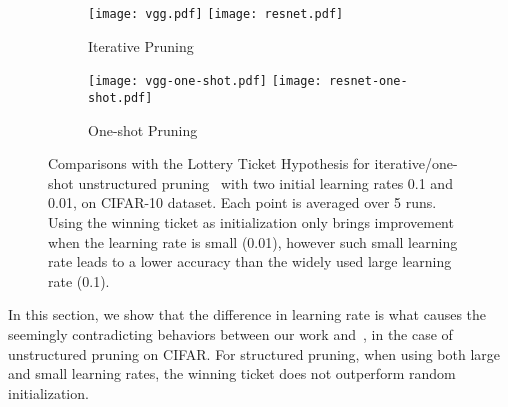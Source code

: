 \begin{figure*}[!ht]
\centering
\begin{minipage}{0.96\textwidth}
 \begin{subfigure}{\textwidth}
 \centering
 \texttt{[image: vgg.pdf]}
 \texttt{[image: resnet.pdf]}
 \caption{Iterative Pruning}
 \label{iterative-1}
 \end{subfigure}
\end{minipage}
 \begin{minipage}{0.96\textwidth}
 \begin{subfigure}{\textwidth}
 \centering
 \texttt{[image: vgg-one-shot.pdf]}
 \texttt{[image: resnet-one-shot.pdf]}
 \caption{One-shot Pruning}
 \label{iterative-3}
 \end{subfigure}
\end{minipage}
    \caption{
    Comparisons with the Lottery Ticket Hypothesis for iterative/one-shot unstructured pruning~\cite{han2015learning} with two initial learning rates 0.1 and 0.01, on CIFAR-10 dataset. Each point is averaged over 5 runs. Using the winning ticket as initialization only brings improvement when the learning rate is small (0.01), however such small learning rate leads to a lower accuracy than the widely used large learning rate (0.1).}
    \label{lottery-figure-1}
\end{figure*}



In this section, we show that the difference in learning rate is what causes the seemingly contradicting behaviors between our work and~\cite{lottery}, in the case of unstructured pruning on CIFAR. For structured pruning, when using both large and small learning rates, the winning ticket does not outperform random initialization.


